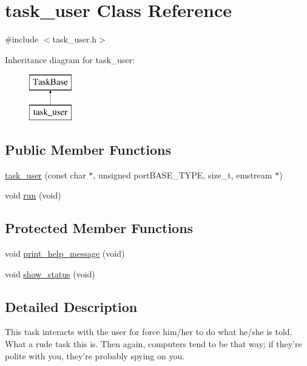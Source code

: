 \hypertarget{classtask__user}{\section{task\-\_\-user Class Reference}
\label{classtask__user}
}


{\ttfamily \#include $<$task\-\_\-user.\-h$>$}

Inheritance diagram for task\-\_\-user\-:\begin{figure}[H]
\begin{center}
\leavevmode
\includegraphics[height=2.000000cm]{classtask__user}
\end{center}
\end{figure}
\subsection*{Public Member Functions}
\begin{DoxyCompactItemize}
\item 
\hyperlink{classtask__user_a3aba77563b375bb14838800608da48bc}{task\-\_\-user} (const char $\ast$, unsigned port\-B\-A\-S\-E\-\_\-\-T\-Y\-P\-E, size\-\_\-t, emstream $\ast$)
\item 
void \hyperlink{classtask__user_adca6429d57be25e8d411414fc8ad75af}{run} (void)
\end{DoxyCompactItemize}
\subsection*{Protected Member Functions}
\begin{DoxyCompactItemize}
\item 
void \hyperlink{classtask__user_a75475060f83bae1e44bcc8a5c34015c7}{print\-\_\-help\-\_\-message} (void)
\item 
void \hyperlink{classtask__user_a105bebbd9cb1031154c3dfc3662db4a0}{show\-\_\-status} (void)
\end{DoxyCompactItemize}


\subsection{Detailed Description}
This task interacts with the user for force him/her to do what he/she is told. What a rude task this is. Then again, computers tend to be that way; if they're polite with you, they're probably spying on you. 

